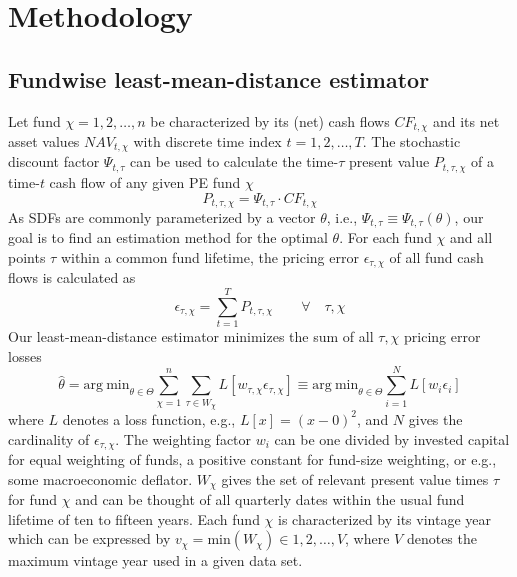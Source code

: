 \documentclass[12pt]{article}
\begin{document}
\section{Methodology}

\subsection{Fundwise least-mean-distance estimator}

Let fund $\chi=1,2,\dots,n$ be characterized by its (net) cash flows ${CF}_{t,\chi}$ and its net asset values ${NAV}_{t,\chi}$ with discrete time index $t=1,2,\dots,T$.
The stochastic discount factor $\Psi_{t,\tau}$ can be used to calculate the time-$\tau$ present value $P_{t,\tau,\chi}$ of a time-$t$ cash flow of any given PE fund $\chi$
\[
P_{t,\tau,\chi} = \Psi_{t,\tau} \cdot CF_{t,\chi}
\]
As SDFs are commonly parameterized by a vector $\theta$, i.e., $\Psi_{t,\tau} \equiv \Psi_{t,\tau} (\theta)$, our goal is to find an estimation method for the optimal $\theta$.
For each fund $\chi$ and all points $\tau$ within a common fund lifetime, the pricing error $\epsilon_{\tau,\chi}$ of all fund cash flows is calculated as
\begin{equation}
\label{eq:pricing_error}
\epsilon_{\tau,\chi} = \sum_{t=1}^T P_{t,\tau,\chi} \qquad \forall \quad \tau,\chi
\end{equation}
Our least-mean-distance estimator minimizes the sum of all $\tau,\chi$ pricing error losses
\begin{equation}
\label{eq:estimator}
\hat{\theta} = 
\mathrm{arg \ min}_{\theta \in \Theta}
\sum_{\chi=1}^{n}
\sum_{\tau \in W_{\chi}}
L \left[ w_{\tau,\chi} \epsilon_{\tau,\chi} \right]
\equiv
\mathrm{arg \ min}_{\theta \in \Theta}
\sum_{i=1}^N
L \left[ w_{i} \epsilon_{i} \right]
\end{equation}
where $L$ denotes a loss function, e.g., $L[x]=(x-0)^2$, and $N$ gives the cardinality of $\epsilon_{\tau,\chi}$.
The weighting factor $w_i$ can be one divided by invested capital for equal weighting of funds, a positive constant for fund-size weighting, or e.g., some macroeconomic deflator.
$W_{\chi}$ gives the set of relevant present value times $\tau$ for fund $\chi$ and can be thought of all quarterly dates within the usual fund lifetime of ten to fifteen years.
Each fund $\chi$ is characterized by its vintage year which can be expressed by $v_{\chi}=\mathrm{min}(W_{\chi}) \in 1,2,\dots,V$, where $V$ denotes the maximum vintage year used in a given data set.
\end{document}
